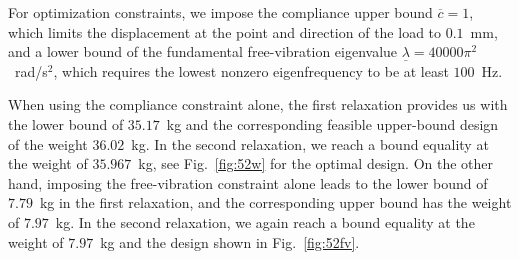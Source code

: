 \documentclass[final,onefignum,onetabnum]{siamart220329}
\begin{document}
For optimization constraints, we impose the compliance upper bound $\overline{c} = 1$, which limits the displacement at the point and direction of the load to $0.1$~mm, and a lower bound of the fundamental free-vibration eigenvalue $\underline{\lambda} = 40000\pi^2$~rad/s$^2$, which requires the lowest nonzero eigenfrequency to be at least $100$~Hz.

When using the compliance constraint alone, the first relaxation provides us with the lower bound of $35.17$~kg and the corresponding feasible upper-bound design of the weight $36.02$~kg. In the second relaxation, we reach a bound equality at the weight of $35.967$~kg, see Fig.~\ref{fig:52w} for the optimal design. On the other hand, imposing the free-vibration constraint alone leads to the lower bound of $7.79$~kg in the first relaxation, and the corresponding upper bound has the weight of $7.97$~kg. In the second relaxation, we again reach a bound equality at the weight of $7.97$~kg and the design shown in Fig.~\ref{fig:52fv}.
\end{document}
